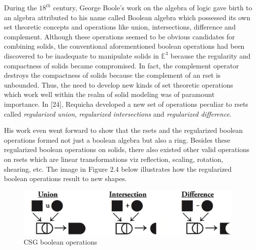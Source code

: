 \hspace{30} During   the   $18^{th}$   century,   George   Boole's   work   on   the   algebra   of   logic   gave  
birth   to   an   algebra   attributed   to   his   name   called   Boolean   algebra   which  
possessed   its   own   set   theoretic   concepts   and   operations   like   union,  
intersections,   difference   and   complement.   Although   these   operations  
seemed   to   be   obvious   candidates   for   combining   solids,   the   conventional  
aforementioned   boolean   operations   had   been   discovered   to   be   inadequate   to  
manipulate   solids   in   $\mathbb{E}^3$ because   the   regularity  
and   compactness   of   solids   became   compromised.   In   fact,   the   complement  
operator   destroys   the   compactness   of   solids   because   the   complement   of   an  
r­set   is   unbounded.   Thus,   the   need   to   develop   new   kinds   of   set   theoretic  
operations   which   work   well   within   the   realm   of   solid   modeling   was   of   paramount  
importance.   In   [24],   Requicha   developed   a   new   set   of   operations   peculiar   to  
r­sets   called   \textit{regularized   union},   \textit{regularized   intersections}   and   \textit{regularized  
difference}.

\hspace{30} His   work   even   went   forward   to   show   that   the   r­sets   and   the   regularized  
boolean   operations   formed   not   just   a   boolean   algebra   but   also   a   ring.   Besides  
these   regularized   boolean   operations   on   solids,   there   also   existed   other   valid  
operations   on   r­sets   which   are   linear   transformations   viz   reflection,   scaling,  
rotation,   shearing,   etc.   The   image   in   Figure   2.4   below   illustrates   how   the  
regularized boolean operations result to new shapes.

\begin{figure}[htbp]
\centering
\includegraphics[trim=0.0cm 0.5cm 0.1cm 0.1cm, clip=true, totalheight=0.12\textheight]{Pictures/Boolean.png}
\caption[CSG boolean operations]{CSG boolean operations}
\label{Boolean}
\end{figure}

